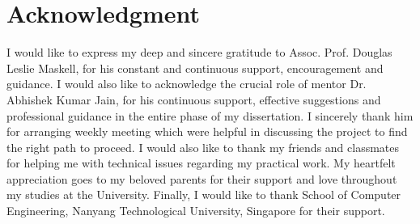 \chapter*{Acknowledgment} 
\label{ch0_Acknowledgement}
I would like to express my deep and sincere gratitude to Assoc. Prof. Douglas Leslie Maskell, for his constant and continuous support, encouragement and guidance. I would also like to acknowledge the crucial role of mentor Dr. Abhishek Kumar Jain, for his continuous support, effective suggestions and professional guidance in the entire phase of my dissertation. I sincerely thank him for arranging weekly meeting which were helpful in discussing the project to find the right path to proceed. I would also like to thank my friends and classmates for helping me with technical issues regarding my practical work. My heartfelt appreciation goes to my beloved parents for their support and love throughout my studies at the University. Finally, I would like to thank School of Computer Engineering, Nanyang Technological University, Singapore for their support.